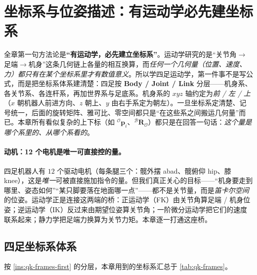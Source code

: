 \section{坐标系与位姿描述：有运动学必先建坐标系}
\label{sec:qk-frames}

\begin{insight}\label{ins:qk-frames-first}
全章第一句方法论是\textbf{“有运动学，必先建立坐标系”}。运动学研究的是“关节角$\to$足端$\to$机身”这条几何链上各量的相互换算，而\emph{任何一个几何量（位置、速度、力）都只有在某个坐标系里才有数值意义}。所以学四足运动学，第一件事不是写公式，而是把坐标系体系建清楚：四足按 \textbf{Body / Joint / Link} 分层——机身系、各关节系、各连杆系，再加世界系与足底系。机身系的 $xyz$ 轴约定为\emph{前 / 左 / 上}（$x$ 朝机器人前进方向、$z$ 朝上、$y$ 由右手系定为朝左）。一旦坐标系定清楚、记号统一，后面的旋转矩阵、雅可比、零空间都只是“在这些系之间搬运几何量”而已。本章所有看似复杂的上下标（如 ${}^{\mathcal{O}}\boldsymbol{p}_{i}$、${}^{\mathcal{B}}\mathbf{R}_{\mathcal{O}}$）都只是在回答一句话：\emph{这个量是哪个系里的、从哪个系看的}。
\end{insight}

\paragraph{动机：12 个电机是唯一可直接控的量。}
四足机器人有 $12$ 个驱动电机（每条腿三个：髋外摆 abad、髋俯仰 hip、膝 knee），这是\emph{唯一}可被直接施加指令的量。但我们真正关心的目标——“机身要走到哪里、姿态如何”“某只脚要落在地面哪一点”——都不是关节量，而是\emph{笛卡尔空间}的位姿\cite{unitree2023quadruped}。运动学正是连接这两端的桥：正运动学（FK）由关节角算足端 / 机身位姿；逆运动学（IK）反过来由期望位姿算关节角；一阶微分运动学把它们的速度联系起来；静力学把足端力换算为关节力矩。本章逐一打通这座桥。

\subsection{四足坐标系体系}
\label{subsec:qk-frame-system}

按 \cref{ins:qk-frames-first} 的分层，本章用到的坐标系汇总于 \cref{tab:qk-frames}。

